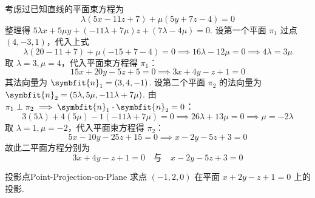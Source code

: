 \begin{solution}
    考虑过已知直线的平面束方程为
    \begin{equation*}
        \lambda(5x - 11z + 7) + \mu(5y + 7z - 4) = 0
    \end{equation*}
    整理得 $5\lambda x + 5\mu y + (-11\lambda + 7\mu)z + (7\lambda - 4\mu) = 0$.
    设第一个平面 $\pi_1$ 过点 $(4, -3, 1)$，代入上式
    \begin{equation*}
        \lambda(20 - 11 + 7) + \mu(-15 + 7 - 4) = 0 \implies 16\lambda - 12\mu = 0 \implies 4\lambda = 3\mu
    \end{equation*}
    取 $\lambda = 3, \mu = 4$，代入平面束方程得 $\pi_1$：
    \begin{equation*}
        15x + 20y - 5z + 5 = 0 \implies 3x + 4y - z + 1 = 0
    \end{equation*}
    其法向量为 $\symbfit{n}_1 = (3, 4, -1)$. 设第二个平面 $\pi_2$ 的法向量为 $\symbfit{n}_2 = (5\lambda, 5\mu, -11\lambda + 7\mu)$.
    由 $\pi_1 \perp \pi_2 \implies \symbfit{n}_1 \cdot \symbfit{n}_2 = 0$：
    \begin{equation*}
        3(5\lambda) + 4(5\mu) - 1(-11\lambda + 7\mu) = 0 \implies 26\lambda + 13\mu = 0 \implies \mu = -2\lambda
    \end{equation*}
    取 $\lambda = 1, \mu = -2$，代入平面束方程得 $\pi_2$：
    \begin{equation*}
        5x - 10y - 25z + 15 = 0 \implies x - 2y - 5z + 3 = 0
    \end{equation*}
    故此二平面方程分别为
    \begin{equation*}
        \boxed{3x + 4y - z + 1 = 0 \quad \text{与} \quad x - 2y - 5z + 3 = 0}
    \end{equation*}
\end{solution}

\begin{problem}{投影点}{Point-Projection-on-Plane}
    求点 $(-1, 2, 0)$ 在平面 $x + 2y - z + 1 = 0$ 上的投影.
\end{problem}


